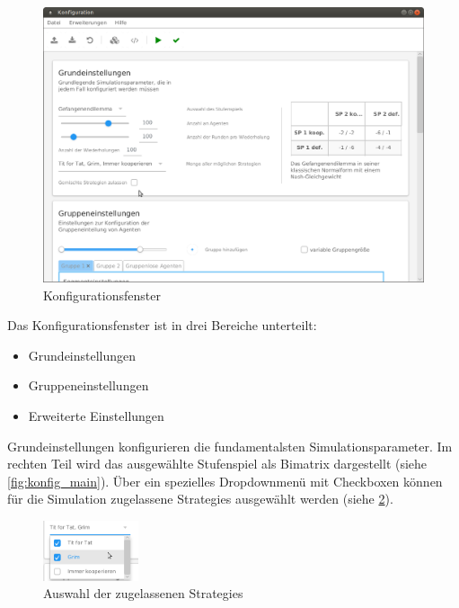 \documentclass[parskip=full,11pt]{scrartcl}
\begin{document}
\begin{figure}[ht]
	\centering
	\includegraphics[width=\textwidth]{images/konfig.png}
	\caption{\label{fig:konfig}
		Konfigurationsfenster}
\end{figure}

Das Konfigurationsfenster ist in drei Bereiche unterteilt:
\begin{itemize} \itemsep -10pt
	\item Grundeinstellungen
	\item Gruppeneinstellungen
	\item Erweiterte Einstellungen
\end{itemize}

Grundeinstellungen konfigurieren die fundamentalsten Simulationsparameter. Im rechten Teil wird das ausgewählte \Gls{Stufenspiel} als \Gls{Bimatrix} dargestellt (siehe \cref{fig:konfig_main}). Über ein spezielles Dropdownmenü mit Checkboxen können für die Simulation zugelassene \Glspl{Strategie} ausgewählt werden (siehe \cref{fig:konfig_strat_detail}).

\begin{figure}[ht]
	\centering
	\includegraphics[width=0.25\textwidth]{images/konfig_strat_detail.png}
	\caption{\label{fig:konfig_strat_detail}
		Auswahl der zugelassenen \Glspl{Strategie}}
\end{figure}
\end{document}
